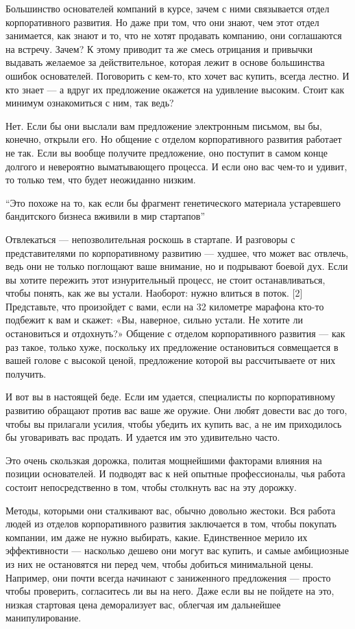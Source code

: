 \documentclass[ebook,12pt,oneside,openany]{memoir}
\begin{document}
Большинство основателей компаний в курсе, зачем с ними связывается
отдел корпоративного развития. Но даже при том, что они знают, чем
этот отдел занимается, как знают и то, что не хотят продавать
компанию, они соглашаются на встречу. Зачем? К этому приводит та же
смесь отрицания и привычки выдавать желаемое за действительное,
которая лежит в основе большинства ошибок основателей. Поговорить с
кем-то, кто хочет вас купить, всегда лестно. И кто знает — а вдруг их
предложение окажется на удивление высоким. Стоит как минимум
ознакомиться с ним, так ведь?

Нет. Если бы они выслали вам предложение электронным письмом, вы бы,
конечно, открыли его. Но общение с отделом корпоративного развития
работает не так. Если вы вообще получите предложение, оно поступит в
самом конце долгого и невероятно выматывающего процесса. И если оно
вас чем-то и удивит, то только тем, что будет неожиданно низким.

“Это похоже на то, как если бы фрагмент генетического материала
устаревшего бандитского бизнеса вживили в мир стартапов”

Отвлекаться — непозволительная роскошь в стартапе. И разговоры с
представителями по корпоративному развитию — худшее, что может вас
отвлечь, ведь они не только поглощают ваше внимание, но и подрывают
боевой дух. Если вы хотите пережить этот изнурительный процесс, не
стоит останавливаться, чтобы понять, как же вы устали. Наоборот: нужно
влиться в поток. [2] Представьте, что произойдет с вами, если на 32
километре марафона кто-то подбежит к вам и скажет: «Вы, наверное,
сильно устали. Не хотите ли остановиться и отдохнуть?» Общение с
отделом корпоративного развития — как раз такое, только хуже,
поскольку их предложение остановиться совмещается в вашей голове с
высокой ценой, предложение которой вы рассчитываете от них получить.



И вот вы в настоящей беде. Если им удается, специалисты по
корпоративному развитию обращают против вас ваше же оружие. Они любят
довести вас до того, чтобы вы прилагали усилия, чтобы убедить их
купить вас, а не им приходилось бы уговаривать вас продать. И удается
им это удивительно часто.

Это очень скользкая дорожка, политая мощнейшими факторами влияния на
позиции основателей. И подводят вас к ней опытные профессионалы, чья
работа состоит непосредственно в том, чтобы столкнуть вас на эту
дорожку.

Методы, которыми они сталкивают вас, обычно довольно жестоки. Вся
работа людей из отделов корпоративного развития заключается в том,
чтобы покупать компании, им даже не нужно выбирать, какие.
Единственное мерило их эффективности — насколько дешево они могут вас
купить, и самые амбициозные из них не остановятся ни перед чем, чтобы
добиться минимальной цены. Например, они почти всегда начинают с
заниженного предложения — просто чтобы проверить, согласитесь ли вы на
него. Даже если вы не пойдете на это, низкая стартовая цена
деморализует вас, облегчая им дальнейшее манипулирование.
\end{document}
